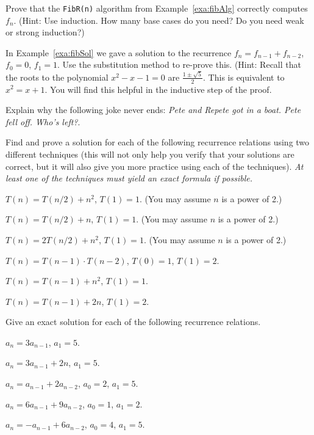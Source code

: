 \begin{pro}
Prove that the \verb+FibR(n)+ algorithm from Example~\ref{exa:fibAlg} correctly computes $f_n$.
(Hint:  Use induction.  How many base cases do you need?  Do you need weak or strong
induction?)
\end{pro}


\begin{pro}
In Example~\ref{exa:fibSol} we gave a solution to the recurrence $f_n=f_{n-1}+f_{n-2}$,
$f_0=0$, $f_1=1$.  Use the substitution method to re-prove this.
(Hint: Recall that  the
roots to the polynomial $x^2-x-1=0$ are $\frac{1 \pm \sqrt{5}}{2}$.  
This is equivalent to $x^2=x+1$. 
You will find this helpful in the inductive step of the proof. 
\end{pro}

\begin{pro}
Explain why the following joke never ends: 
{\em Pete and Repete got in a boat.  Pete fell off.  Who's left?}.
\end{pro}

\begin{pro}
Find and prove a solution for each of the following recurrence relations using two different
techniques (this will not only help you verify that your solutions are correct, but
it will also give you more practice using each of the techniques).  
{\em At least one of the techniques must yield an exact formula if possible.}
\begin{lenum}
\item $T(n)=T(n/2)+n^2$, $T(1)=1$. (You may assume $n$ is a power of 2.)
\item $T(n)=T(n/2)+n$, $T(1)=1$. (You may assume $n$ is a power of 2.)
\item $T(n)=2T(n/2)+n^2$, $T(1)=1$. (You may assume $n$ is a power of 2.)
\item $T(n)=T(n-1)\cdot T(n-2)$, $T(0)=1$, $T(1)=2$. %
\item $T(n)=T(n-1)+n^2$, $T(1)=1$. %
\item $T(n)=T(n-1)+2n$, $T(1)=2$.
\end{lenum}

\end{pro}


\begin{pro}
Give an exact solution for each of the following recurrence relations.
\begin{lenum}
\item $a_n=3a_{n-1}$, $a_1=5$.
\item $a_n=3a_{n-1}+2n$, $a_1=5$.
\item $a_n=a_{n-1}+2a_{n-2}$, $a_0=2$, $a_1=5$.
\item $a_n=6a_{n-1}+9a_{n-2}$, $a_0=1$, $a_1=2$.
\item $a_n=-a_{n-1}+6a_{n-2}$, $a_0=4$, $a_1=5$.
\end{lenum}

\end{pro}


